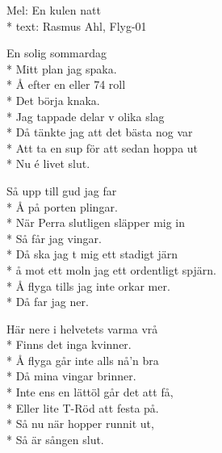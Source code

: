 \begin{SongText}
    \begin{SongInfo}
        Mel: En kulen natt\\*%
        text: Rasmus Ahl, Flyg-01
    \end{SongInfo}
    \begin{SongVerse}
        En solig sommardag\\*%
        Mitt plan jag spaka.\\*%
        Å efter en eller 74 roll\\*%
        Det börja knaka.\\*%
        Jag tappade delar v olika slag\\*%
        Då tänkte jag att det bästa nog var\\*%
        Att ta en sup för att sedan hoppa ut\\*%
        Nu é livet slut.
    \end{SongVerse}
    \begin{SongVerse}
        Så upp till gud jag far\\*%
        Å på porten plingar.\\*%
        När Perra slutligen släpper mig in\\*%
        Så får jag vingar.\\*%
        Då ska jag t mig ett stadigt järn\\*%
        å mot ett moln jag ett ordentligt spjärn.\\*%
        Å flyga tills jag inte orkar mer.\\*%
        Då far jag ner.
    \end{SongVerse}
    \begin{SongVerse}
        Här nere i helvetets varma vrå\\*%
        Finns det inga kvinner.\\*%
        Å flyga går inte alls nå'n bra\\*%
        Då mina vingar brinner.\\*%
        Inte ens en lättöl går det att få,\\*%
        Eller lite T-Röd att festa på.\\*%
        Så nu när hopper runnit ut,\\*%
        Så är sången slut.
    \end{SongVerse}
\end{SongText}
